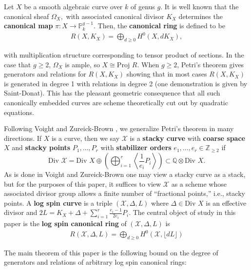 \documentclass{amsart}
\theoremstyle{plain}
\theoremstyle{definition}
\theoremstyle{remark}
\numberwithin{equation}{section}
\newcommand\BQ{{\mathbb Q}}
\newcommand\BP{{\mathbb P}}
\newcommand\BZ{{\mathbb Z}}
\newcommand \sx{\mathscr X}
\newcommand \proj{\text{Proj }}
\newcommand \di{\text{Div }}
\newcommand \subhalf[1]{\frac{{#1} - 1}{2{#1}}}
\newcommand \halfcan{L}
\begin{document}
Let $X$ be a smooth algebraic curve over $k$ of genus $g$. It is
well known that the canonical sheaf $\Omega _X,$ with associated canonical divisor $K_X$
 determines the {\bf canonical map } $\pi:X \rightarrow \BP_k^{g - 1}$.
Then, the {\bf canonical ring} is defined to be
\begin{align*}
	R(X,K_X) = \bigoplus_{d \geq 0} H^0(X, dK_X),
\end{align*}

\noindent
with multiplication structure corresponding to tensor product of
sections. In the case that $g \geq 2$, $\Omega_X$ is ample, so $X \cong \proj R$. When $g \geq 2$, Petri's
theorem gives generators and relations for $R(X, K_X)$ showing that
in most cases $R(X, K_X)$ is generated in degree 1 with relations
in degree 2 (one demonstration is given by Saint-Donat\cite[p. 157]{saint-donat:proj}). This has the
pleasant geometric consequence that all such canonically embedded
curves are scheme theoretically cut out by quadratic equations.

Following Voight and Zureick-Brown \cite{vzb:stacky}, we generalize Petri's theorem in many 
directions. 
If $X$ is a curve,  then we say $\sx$ is a {\bf stacky curve} with {\bf coarse space} $X$ and {\bf stacky points} $P_1,\ldots, P_r$ with {\bf stabilizer orders} $e_1,\ldots, e_r \in \BZ_{\geq 2}$ if 
$$\di \sx = \di X \oplus \left(\bigoplus_{i
= 1}^r \left\langle \frac{1}{e_i}P_i \right\rangle \right) \subset \BQ \otimes \di X.$$
As is done in Voight and Zureick-Brown \cite{vzb:stacky} one may view a stacky curve as a stack, but for the purposes of this paper, it suffices to view $\sx$ as a scheme whose associated divisor group allows a finite number of ``fractional points,'' i.e., stacky points. A {\bf log spin curve} is a triple $(\sx, \Delta, \halfcan)$ where $\Delta \in \di X$ is an effective divisor and $2\halfcan = K_X + \Delta + \sum_{i=1}^{r}\subhalf{e_i}P_i.$
The central object of study in this paper is the {\bf log spin
canonical ring} of $(\sx,\Delta,L)$ is
\begin{align*}
	R(\sx,\Delta,L) = \bigoplus_{d \geq 0} H^0(\sx,\lfloor d L \rfloor)
\end{align*}

\noindent
The main theorem of this paper is the following bound on the degree
of generators and relations of arbitrary log spin canonical rings:
\end{document}
